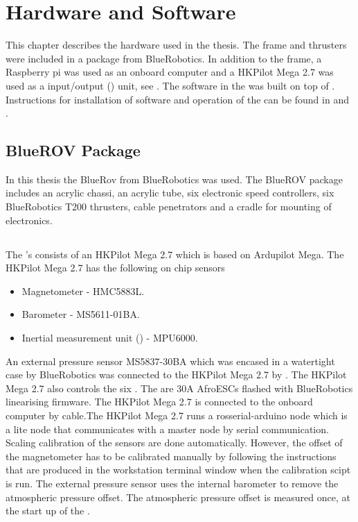 \chapter{Hardware and Software}\label{cha:hardware}
This chapter describes the hardware used in the thesis. The \abbrROV frame and thrusters were included in a package from BlueRobotics. In addition to the \abbrROV frame, a Raspberry pi was used as an onboard computer and a HKPilot Mega 2.7  was used as a input/output (\abbrIO) unit, see . The software in the \abbrROV was built on top of \abbrROS.  Instructions for installation of software and operation of the \abbrROV can be found in  and .

\section{BlueROV Package}
In this thesis the BlueRov from BlueRobotics was used. The BlueROV package includes an acrylic chassi, an acrylic tube, six electronic speed controllers, six BlueRobotics T200 thrusters, cable penetrators and a cradle for mounting of electronics.
\section{\abbrROV \abbrIO}
The \abbrROV's \abbrIO consists of an HKPilot Mega 2.7 which is based on Ardupilot Mega. The HKPilot Mega 2.7 has the following on chip sensors
\begin{itemize}
    \item Magnetometer - HMC5883L.
    \item Barometer - MS5611-01BA.
    \item Inertial measurement unit (\abbrIMU) - MPU6000.
\end{itemize}
An external pressure sensor MS5837-30BA which was encased in a watertight case by BlueRobotics was connected to the HKPilot Mega 2.7 by \abbrIC.
The HKPilot Mega 2.7 also controls the six \abbrESCs. The \abbrESCs are 30A AfroESCs flashed with BlueRobotics linearising firmware. The HKPilot Mega 2.7 is connected to the onboard computer by \abbrUSB cable.The HKPilot Mega 2.7 runs a rosserial-arduino node which is a lite \abbrROS node that communicates with a master node by serial communication. Scaling calibration of the sensors are done automatically. However, the offset of the magnetometer has to be calibrated manually by following the instructions that are produced in the workstation terminal window when the calibration scipt is run. The external pressure sensor uses the internal barometer to remove the atmospheric pressure offset. The atmospheric pressure offset is measured once, at the start up of the \abbrROV.

